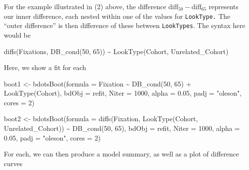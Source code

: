 \documentclass[
]{article}
\newenvironment{Shaded}{\begin{snugshade}}{\end{snugshade}}
\newcommand{\AttributeTok}[1]{\textcolor[rgb]{0.77,0.63,0.00}{#1}}
\newcommand{\DecValTok}[1]{\textcolor[rgb]{0.00,0.00,0.81}{#1}}
\newcommand{\FloatTok}[1]{\textcolor[rgb]{0.00,0.00,0.81}{#1}}
\newcommand{\FunctionTok}[1]{\textcolor[rgb]{0.00,0.00,0.00}{#1}}
\newcommand{\NormalTok}[1]{#1}
\newcommand{\OtherTok}[1]{\textcolor[rgb]{0.56,0.35,0.01}{#1}}
\newcommand{\SpecialCharTok}[1]{\textcolor[rgb]{0.00,0.00,0.00}{#1}}
\newcommand{\StringTok}[1]{\textcolor[rgb]{0.31,0.60,0.02}{#1}}
\begin{document}
For the example illustrated in (2) above, the difference
\(\text{diff}_{50} - \text{diff}_{65}\) represents our inner difference,
each nested within one of the values for \texttt{LookType.} The ``outer
difference'' is then difference of these between \texttt{LookTypes}. The
syntax here would be

\begin{Shaded}
\begin{Highlighting}[]
\FunctionTok{diffs}\NormalTok{(Fixations, }\FunctionTok{DB\_cond}\NormalTok{(}\DecValTok{50}\NormalTok{, }\DecValTok{65}\NormalTok{)) }\SpecialCharTok{\textasciitilde{}} \FunctionTok{LookType}\NormalTok{(Cohort, Unrelated\_Cohort)}
\end{Highlighting}
\end{Shaded}

Here, we show a fit for each

\begin{Shaded}
\begin{Highlighting}[]
\NormalTok{boot1 }\OtherTok{\textless{}{-}} \FunctionTok{bdotsBoot}\NormalTok{(}\AttributeTok{formula =}\NormalTok{ Fixation }\SpecialCharTok{\textasciitilde{}} \FunctionTok{DB\_cond}\NormalTok{(}\DecValTok{50}\NormalTok{, }\DecValTok{65}\NormalTok{) }\SpecialCharTok{+} \FunctionTok{LookType}\NormalTok{(Cohort),}
                   \AttributeTok{bdObj =}\NormalTok{ refit,}
                   \AttributeTok{Niter =} \DecValTok{1000}\NormalTok{,}
                   \AttributeTok{alpha =} \FloatTok{0.05}\NormalTok{,}
                   \AttributeTok{padj =} \StringTok{"oleson"}\NormalTok{,}
                   \AttributeTok{cores =} \DecValTok{2}\NormalTok{)}

\NormalTok{boot2 }\OtherTok{\textless{}{-}} \FunctionTok{bdotsBoot}\NormalTok{(}\AttributeTok{formula =} \FunctionTok{diffs}\NormalTok{(Fixation, }\FunctionTok{LookType}\NormalTok{(Cohort, Unrelated\_Cohort)) }\SpecialCharTok{\textasciitilde{}} \FunctionTok{DB\_cond}\NormalTok{(}\DecValTok{50}\NormalTok{, }\DecValTok{65}\NormalTok{),}
                   \AttributeTok{bdObj =}\NormalTok{ refit,}
                   \AttributeTok{Niter =} \DecValTok{1000}\NormalTok{,}
                   \AttributeTok{alpha =} \FloatTok{0.05}\NormalTok{,}
                   \AttributeTok{padj =} \StringTok{"oleson"}\NormalTok{,}
                   \AttributeTok{cores =} \DecValTok{2}\NormalTok{)}
\end{Highlighting}
\end{Shaded}

For each, we can then produce a model summary, as well as a plot of
difference curves
\end{document}

